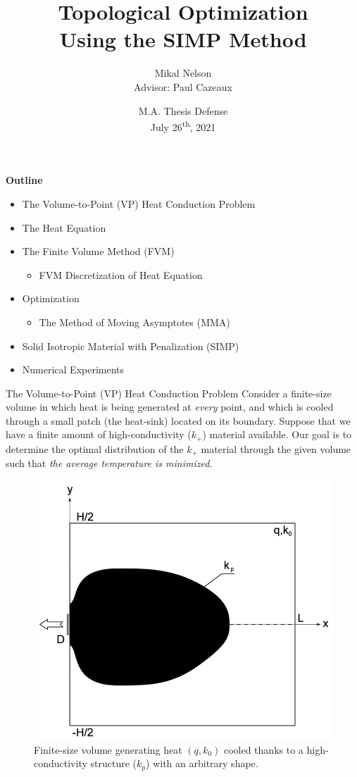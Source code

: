 \documentclass[final]{beamer}
\title[SIMP Optimization]{\bf Topological Optimization\\Using the SIMP Method}
\author[Mikal Nelson]{Mikal Nelson\\
Advisor: Paul Cazeaux
}
\institute[KU]{
{University of Kansas}\\
Department of Mathematics\\
mikal.nelson@ku.edu\\
}
\date[M.A. Thesis Defense]{
\small M.A. Thesis Defense\\
July 26\textsuperscript{th}, 2021
}
\begin{document}
\begin{frame}
	\titlepage
\end{frame}

\begin{frame}{\textbf{Outline}}
	\begin{itemize}
		\item The Volume-to-Point (VP) Heat Conduction Problem
		\item The Heat Equation
		\item The Finite Volume Method (FVM)
		\begin{itemize}
			\item FVM Discretization of Heat Equation
		\end{itemize}
		\item Optimization
		\begin{itemize}
			\item The Method of Moving Asymptotes (MMA)
		\end{itemize}
		\item Solid Isotropic Material with Penalization (SIMP)
		\item Numerical Experiments
	\end{itemize}
\end{frame}

\begin{frame}[t]{The Volume-to-Point (VP) Heat Conduction Problem}
	\pause
	Consider a finite-size volume in which {\color{tiananmen}heat is being generated at \textit{every} point}, and which is cooled through a small patch (the heat-sink) located on its boundary.
	\pause
	\vfill
	Suppose that we have a {\color{tiananmen}finite amount of high-conductivity ($k_+$)} material available.
	\vfill
	\pause
	Our goal is to {\color{baystate}determine the optimal distribution of the $k_+$ material} through the given volume such that {\color{baystate}\textit{the average temperature is minimized}}.\vfill
\end{frame}

\begin{frame}
	\begin{figure}
		\centering
		\includegraphics[height=0.65\textwidth]{VP-Problem.png}
		\caption[VP Problem Diagram]{Finite-size volume generating heat $(q, k_0)$ cooled thanks to a high-conductivity structure ($k_p$) with an arbitrary shape. \cite{Marck2012}}
	\end{figure}
\end{frame}
\end{document}
